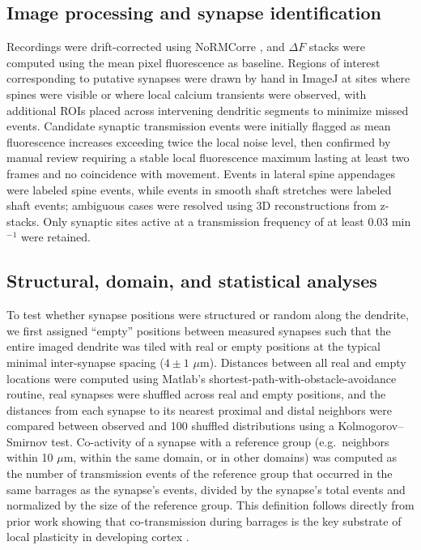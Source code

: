 \documentclass[11pt]{article}
\begin{document}
\subsection{Image processing and synapse identification}
Recordings were drift-corrected using NoRMCorre \citep{pnevmatikakis2017normcorre}, and $\Delta F$ stacks were computed using the mean pixel fluorescence as baseline. Regions of interest corresponding to putative synapses were drawn by hand in ImageJ at sites where spines were visible or where local calcium transients were observed, with additional ROIs placed across intervening dendritic segments to minimize missed events. Candidate synaptic transmission events were initially flagged as mean fluorescence increases exceeding twice the local noise level, then confirmed by manual review requiring a stable local fluorescence maximum lasting at least two frames and no coincidence with movement. Events in lateral spine appendages were labeled spine events, while events in smooth shaft stretches were labeled shaft events; ambiguous cases were resolved using 3D reconstructions from z-stacks. Only synaptic sites active at a transmission frequency of at least 0.03 min$^{-1}$ were retained.

\subsection{Structural, domain, and statistical analyses}
To test whether synapse positions were structured or random along the dendrite, we first assigned ``empty'' positions between measured synapses such that the entire imaged dendrite was tiled with real or empty positions at the typical minimal inter-synapse spacing ($4 \pm 1$ $\mu$m). Distances between all real and empty locations were computed using Matlab's shortest-path-with-obstacle-avoidance routine, real synapses were shuffled across real and empty positions, and the distances from each synapse to its nearest proximal and distal neighbors were compared between observed and 100 shuffled distributions using a Kolmogorov--Smirnov test. Co-activity of a synapse with a reference group (e.g.\ neighbors within 10 $\mu$m, within the same domain, or in other domains) was computed as the number of transmission events of the reference group that occurred in the same barrages as the synapse's events, divided by the synapse's total events and normalized by the size of the reference group. This definition follows directly from prior work showing that co-transmission during barrages is the key substrate of local plasticity in developing cortex \citep{winnubst2012synaptic}.
\end{document}

